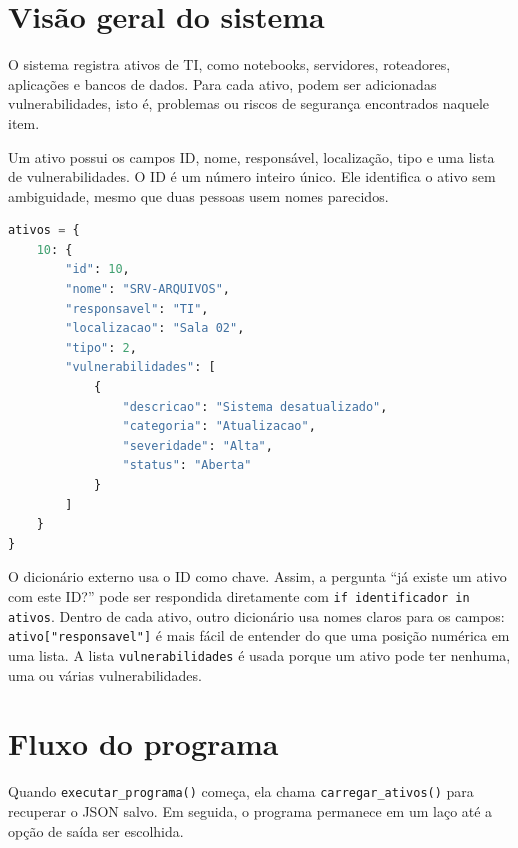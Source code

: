 \documentclass[11pt,a4paper]{article}
\begin{document}
\section{Visão geral do sistema}

O sistema registra ativos de TI, como notebooks, servidores, roteadores, aplicações e bancos de dados. Para cada ativo, podem ser adicionadas vulnerabilidades, isto é, problemas ou riscos de segurança encontrados naquele item.

Um ativo possui os campos ID, nome, responsável, localização, tipo e uma lista de vulnerabilidades. O ID é um número inteiro único. Ele identifica o ativo sem ambiguidade, mesmo que duas pessoas usem nomes parecidos.

\begin{lstlisting}[language=Python,caption={Formato dos dados na memória}]
ativos = {
    10: {
        "id": 10,
        "nome": "SRV-ARQUIVOS",
        "responsavel": "TI",
        "localizacao": "Sala 02",
        "tipo": 2,
        "vulnerabilidades": [
            {
                "descricao": "Sistema desatualizado",
                "categoria": "Atualizacao",
                "severidade": "Alta",
                "status": "Aberta"
            }
        ]
    }
}
\end{lstlisting}

O dicionário externo usa o ID como chave. Assim, a pergunta ``já existe um ativo com este ID?'' pode ser respondida diretamente com \texttt{if identificador in ativos}. Dentro de cada ativo, outro dicionário usa nomes claros para os campos: \texttt{ativo["responsavel"]} é mais fácil de entender do que uma posição numérica em uma lista. A lista \texttt{vulnerabilidades} é usada porque um ativo pode ter nenhuma, uma ou várias vulnerabilidades.

\section{Fluxo do programa}

Quando \texttt{executar\_programa()} começa, ela chama \texttt{carregar\_ativos()} para recuperar o JSON salvo. Em seguida, o programa permanece em um laço até a opção de saída ser escolhida.
\end{document}
